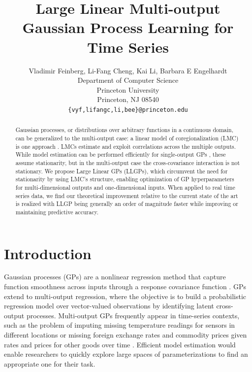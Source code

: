\documentclass{article}
\title{Large Linear Multi-output Gaussian Process Learning for Time Series}
\author{
  Vladimir Feinberg, Li-Fang Cheng,  {Kai Li}, {Barbara E Engelhardt}\\
  Department of Computer Science\\
  Princeton University\\
  Princeton, NJ 08540 \\
  \texttt{\{vyf,lifangc,li,bee\}@princeton.edu} \\
}
\begin{document}
\maketitle

\begin{abstract}
Gaussian processes, or distributions over arbitrary functions in a continuous domain, can be generalized to the multi-output case: a linear model of coregionalization (LMC) is one approach \cite{alvarez2012kernels}. LMCs estimate and exploit correlations across the multiple outputs.
While model estimation can be performed efficiently for single-output GPs \cite{msgp}, these assume stationarity, but in the multi-output case the cross-covariance interaction is not stationary.
We propose Large Linear GPs (LLGPs), which circumvent the need for stationarity by using LMC's structure, enabling optimization of GP hyperparameters for multi-dimensional outputs and one-dimensional inputs. When applied to real time series data, we find our theoretical improvement relative to the current state of the art is realized with LLGP being generally an order of magnitude faster while improving or maintaining predictive accuracy.
\end{abstract}


\section{Introduction}\label{introduction}

Gaussian processes (GPs) are a nonlinear regression method that capture function smoothness across inputs through a response covariance function \cite{williams1996gaussian}. GPs extend to multi-output regression, where the objective is to build a probabilistic regression model over vector-valued observations by identifying latent cross-output processes. Multi-output GPs frequently appear in time-series contexts, such as the problem of imputing missing temperature readings for sensors in different locations or missing foreign exchange rates and commodity prices given rates and prices for other goods over time \cite{osborne2008towards, alvarez2010efficient}. Efficient model estimation would enable researchers to quickly explore large spaces of parameterizations to find an appropriate one for their task.
\end{document}
